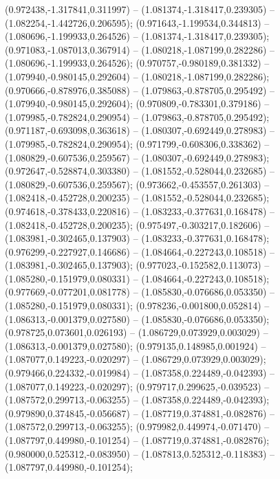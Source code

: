  (0.972438,-1.317841,0.311997) -- (1.081374,-1.318417,0.239305) -- (1.082254,-1.442726,0.206595);
 (0.971643,-1.199534,0.344813) -- (1.080696,-1.199933,0.264526) -- (1.081374,-1.318417,0.239305);
 (0.971083,-1.087013,0.367914) -- (1.080218,-1.087199,0.282286) -- (1.080696,-1.199933,0.264526);
 (0.970757,-0.980189,0.381332) -- (1.079940,-0.980145,0.292604) -- (1.080218,-1.087199,0.282286);
 (0.970666,-0.878976,0.385088) -- (1.079863,-0.878705,0.295492) -- (1.079940,-0.980145,0.292604);
 (0.970809,-0.783301,0.379186) -- (1.079985,-0.782824,0.290954) -- (1.079863,-0.878705,0.295492);
 (0.971187,-0.693098,0.363618) -- (1.080307,-0.692449,0.278983) -- (1.079985,-0.782824,0.290954);
 (0.971799,-0.608306,0.338362) -- (1.080829,-0.607536,0.259567) -- (1.080307,-0.692449,0.278983);
 (0.972647,-0.528874,0.303380) -- (1.081552,-0.528044,0.232685) -- (1.080829,-0.607536,0.259567);
 (0.973662,-0.453557,0.261303) -- (1.082418,-0.452728,0.200235) -- (1.081552,-0.528044,0.232685);
 (0.974618,-0.378433,0.220816) -- (1.083233,-0.377631,0.168478) -- (1.082418,-0.452728,0.200235);
 (0.975497,-0.303217,0.182606) -- (1.083981,-0.302465,0.137903) -- (1.083233,-0.377631,0.168478);
 (0.976299,-0.227927,0.146686) -- (1.084664,-0.227243,0.108518) -- (1.083981,-0.302465,0.137903);
 (0.977023,-0.152582,0.113073) -- (1.085280,-0.151979,0.080331) -- (1.084664,-0.227243,0.108518);
 (0.977669,-0.077201,0.081778) -- (1.085830,-0.076686,0.053350) -- (1.085280,-0.151979,0.080331);
 (0.978236,-0.001800,0.052814) -- (1.086313,-0.001379,0.027580) -- (1.085830,-0.076686,0.053350);
 (0.978725,0.073601,0.026193) -- (1.086729,0.073929,0.003029) -- (1.086313,-0.001379,0.027580);
 (0.979135,0.148985,0.001924) -- (1.087077,0.149223,-0.020297) -- (1.086729,0.073929,0.003029);
 (0.979466,0.224332,-0.019984) -- (1.087358,0.224489,-0.042393) -- (1.087077,0.149223,-0.020297);
 (0.979717,0.299625,-0.039523) -- (1.087572,0.299713,-0.063255) -- (1.087358,0.224489,-0.042393);
 (0.979890,0.374845,-0.056687) -- (1.087719,0.374881,-0.082876) -- (1.087572,0.299713,-0.063255);
 (0.979982,0.449974,-0.071470) -- (1.087797,0.449980,-0.101254) -- (1.087719,0.374881,-0.082876);
 (0.980000,0.525312,-0.083950) -- (1.087813,0.525312,-0.118383) -- (1.087797,0.449980,-0.101254);
